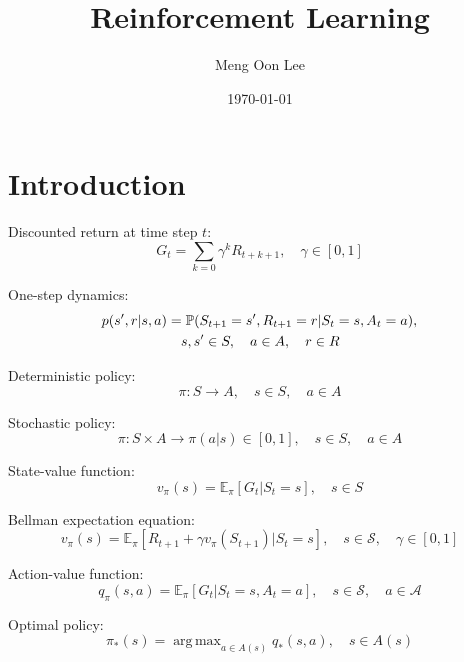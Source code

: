 \documentclass{article}
\title{Reinforcement Learning}
\author{Meng Oon Lee}
\date{\today}
\DeclareMathOperator*{\argmax}{arg\,max}
\begin{document}
\maketitle

\section{Introduction}

Discounted return at time step $t$:
\begin{equation}
G_t = \sum_{k=0} \gamma^k R_{t+k+1}, \quad \gamma \in [0, 1]
\end{equation}

One-step dynamics:
\begin{align}
p(s', r | s, a) &= \mathbb{P}(S_{t+1}=s', R_{t+1}=r | S_t=s, A_t=a), \\
&\quad s, s' \in S, \quad a \in A, \quad r \in R \notag
\end{align}

Deterministic policy:
\begin{equation}
\pi : S \rightarrow A, \quad s \in S, \quad a \in A
\end{equation}

Stochastic policy:
\begin{equation}
\pi : S \times A \rightarrow \pi(a|s) \in [0, 1], \quad s \in S, \quad a \in A
\end{equation}

State-value function:
\begin{equation}
v_{\pi}(s) = \mathbb{E}_{\pi}[G_t | S_t=s], \quad s \in S
\end{equation}

Bellman expectation equation:
\begin{equation}
v_{\pi}(s) = \mathbb{E}_{\pi}[R_{t+1} + \gamma v_{\pi}(S_{t+1}) | S_t=s], 
\quad s \in \mathcal{S}, \quad \gamma \in [0, 1]
\end{equation}

Action-value function:
\begin{equation}
q_{\pi}(s, a) = \mathbb{E}_{\pi}[G_t | S_t=s, A_t=a], 
\quad s \in \mathcal{S}, \quad a \in \mathcal{A}
\end{equation}

Optimal policy:
\begin{equation}
\pi_*(s) = \argmax_{a \in A(s)} q_*(s, a), \quad s \in A(s)
\end{equation}
\end{document}
